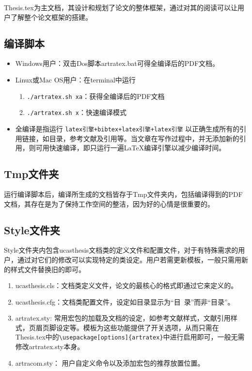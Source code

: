 Thesis.tex为主文档，其设计和规划了论文的整体框架，通过对其的阅读可以让用户了解整个论文框架的搭建。

\subsection{编译脚本}

\begin{itemize}
    \item Windows用户：双击Dos脚本artratex.bat可得全编译后的PDF文档。
    \item Linux或Mac OS用户：在terminal中运行
        \begin{enumerate}
            \item \verb|./artratex.sh xa|：获得全编译后的PDF文档
            \item \verb|./artratex.sh x|：快速编译模式
        \end{enumerate}
    \item 全编译是指运行 \verb|latex引擎+bibtex+latex引擎+latex引擎| 以正确生成所有的引用链接，如目录，参考文献及引用等。当文章在写作过程中，并无添加新的引用，则可用快速编译，即只运行一遍\LaTeX{}编译引擎以减少编译时间。
\end{itemize}


\subsection{Tmp文件夹}

运行编译脚本后，编译所生成的文档皆存于Tmp文件夹内，包括编译得到的PDF文档，其存在是为了保持工作空间的整洁，因为好的心情是很重要的。

\subsection{Style文件夹}

Style文件夹内包含ucasthesis文档类的定义文件和配置文件，对于有特殊需求的用户，通过对它们的修改可以实现特定的类设定。用户若需更新模板，一般只需用新的样式文件替换旧的即可。

\begin{enumerate}
  \item ucasthesis.cls：文档类定义文件，论文的最核心的格式即通过它来定义的。
  \item ucasthesis.cfg：文档类配置文件，设定如目录显示为“目~录”而非“目录”。
  \item artratex.sty: 常用宏包的加载及文档的设定，如参考文献样式，文献引用样式，页眉页脚设定等。模板为这些功能提供了开关选项，从而只需在Thesis.tex中的\verb+\usepackage[options]{artratex}+中进行启用即可，一般无需修改artratex.sty本身。
  \item artracom.sty： 用户自定义命令以及添加宏包的推荐放置位置。
\end{enumerate}

